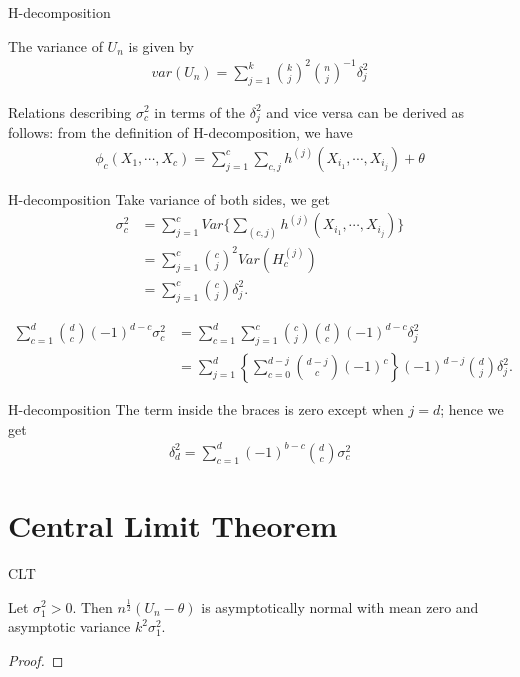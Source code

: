 \documentclass{beamer}
\theoremstyle{definition}
\numberwithin{Def}{section}
\begin{document}
    
\begin{frame}{H-decomposition}
    \begin{theorem}
    The variance of $U_n$ is given by 
    \begin{align}
        var(U_n) = \sum_{j=1}^k {k \choose j}^2 {n \choose j}^{-1}\delta_j^2
    \end{align}
    \end{theorem}
    Relations describing $\sigma_{c}^2$ in terms of the $\delta_j^2 $ and vice versa can be derived as follows: from the definition of H-decomposition, we have 
    \begin{align*}
        \phi_c (X_1, \cdots, X_c) = \sum_{j = 1}^c \sum_{c,j} h^{(j)} (X_{i_{1}}, \cdots , X_{i_j}) + \theta
    \end{align*}
    \end{frame}
    
    \begin{frame}{H-decomposition}
    Take variance of both sides,  we get 
    \begin{align*}
        \sigma_{c}^2 &= \sum_{j = 1}^c Var\{ \sum_{(c, j)} h^{(j)} (X_{i_{1}}, \cdots , X_{i_j})\} \\
        &= \sum_{j = 1}^c {c \choose j}^2 Var( H_c^{(j)}) \\ 
        &= \sum_{j = 1}^c {c \choose j} \delta_j^2.
    \end{align*}

    \begin{align*}
        \sum_{c=1}^d {d \choose c} (-1)^{d-c} \sigma_{c}^2 &= \sum_{c=1}^d  
       \sum_{j = 1}^c {c \choose j}  {d \choose c} (-1)^{d-c} \delta_j^2 \\
       &= \sum_{j=1}^d \left\{ \sum_{c = 0}^{d - j} {d - j \choose c} (-1)^c \right\} (-1)^{d -j} {d \choose j} \delta_j^2.
    \end{align*}
    \end{frame}
    
    \begin{frame}{H-decomposition}
    The term inside the braces is zero except when $j = d$; hence we get 
    \begin{align*}
        \delta_d^2 = \sum_{c = 1}^d (-1)^{b-c} {d \choose c} \sigma_{c}^2
    \end{align*}
    
    \end{frame}
    

\section{Central Limit Theorem}
\begin{frame}{CLT}
    \begin{theorem}
    Let $\sigma_1^{2} > 0$. Then $n^{\frac{1}{2}}(U_n - \theta)$ is asymptotically normal with mean zero and asymptotic variance $k^2 \sigma_1^2$.
    \end{theorem}
    
    \begin{proof}
    
    \end{proof}
\end{frame}
\end{document}
